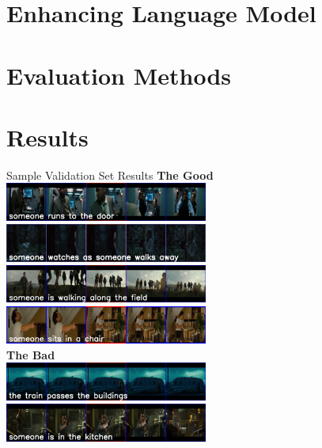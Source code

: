 \documentclass{beamer}
\begin{document}
\section{Enhancing Language Model}
\section{Evaluation Methods}
\section{Results}
\begin{frame}{Sample Validation Set Results}
    \textbf{The Good}\\[2mm]
    \includegraphics[width=0.5\textwidth]{images/230350439_genCap.png}\hspace*{0.01\textwidth} \includegraphics[width=0.5\textwidth]{images/110270280_genCapEdited.png}\\[2mm]
    \includegraphics[width=0.5\textwidth]{images/110510033_genCap.png}\hspace*{0.01\textwidth} \includegraphics[width=0.5\textwidth]{images/140760125_genCap.png}\\[2mm]
    \textbf{The Bad}\\[2mm]
    \includegraphics[width=0.5\textwidth]{images/110260059_genCap.png}\hspace*{0.01\textwidth} \includegraphics[width=0.5\textwidth]{images/110260532_genCap.png}\\[2mm]

\end{frame}
\end{document}
